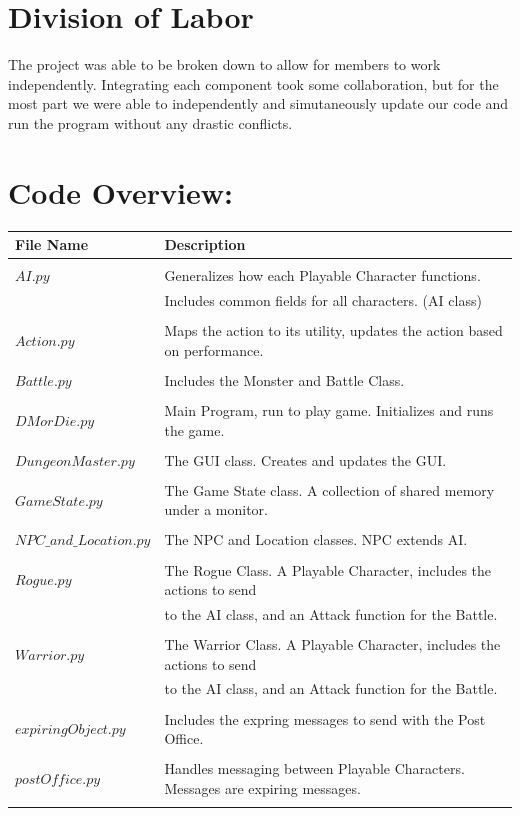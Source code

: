 \documentclass{article}
\theoremstyle{definition}
\begin{document}
\section*{\huge{Division of Labor}}
The project was able to be broken down to allow for members to work independently.
Integrating each component took some collaboration, but for the most part we were
able to independently and simutaneously update our code and run the program without 
any drastic conflicts.

\section*{\huge{Code Overview:}}
\begin{tabular}{ll}
File Name & Description \\
\hline \\
$AI.py$ & Generalizes how each Playable Character functions. \\
& Includes common fields for all characters. (AI class)\\ \\
$Action.py$ & Maps the action to its utility, updates the action based on performance. \\ \\
$Battle.py$ & Includes the Monster and Battle Class.  \\ \\
$DMorDie.py$ & Main Program, run to play game. Initializes and runs the game. \\ \\
$DungeonMaster.py$ & The GUI class. Creates and updates the GUI. \\ \\
$GameState.py$ & The Game State class. A collection of shared memory under a monitor. \\ \\
$NPC\_and\_Location.py$ & The NPC and Location classes. NPC extends AI. \\ \\
$Rogue.py$ & The Rogue Class. A Playable Character, includes the actions to send \\
&            to the AI class, and an Attack function for the Battle. \\ \\
$Warrior.py$ & The Warrior Class. A Playable Character, includes the actions to send \\
&            to the AI class, and an Attack function for the Battle. \\ \\
$expiringObject.py$ & Includes the expring messages to send with the Post Office. \\ \\
$postOffice.py$ & Handles messaging between Playable Characters. Messages are expiring messages.\\ \\
\end{tabular}
\end{document}
